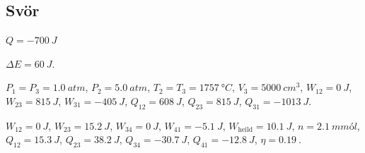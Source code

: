 \ifdefined \wholebook \else\documentclass[oneside]{book}\usepackage{EdlBook}\graphicspath{{figures/}}
\begin{document}
\subsection*{Svör}

\begin{enumerate*}[label = \vspace{0.15cm} \textbf{(\arabic*)}]
\setcounter{enumi}{13}
  \item $Q= \SI{-700}{J}$
  \item $\Delta E = \SI{60}{J}$.
  \item $P_1 = P_3 = \SI{1.0}{atm}$, $P_2 = \SI{5.0}{atm}$, $T_2 = T_3 = \SI{1757}{\degree C}$, $V_3 = \SI{5000}{cm^3}$, $W_{12} = \SI{0}{J}$, $W_{23} = \SI{815}{J}$, $W_{31} = \SI{-405}{J}$, $Q_{12} = \SI{608}{J}$, $Q_{23} = \SI{815}{J}$, $Q_{31} = \SI{-1013}{J}$.
  \item $W_{12} = \SI{0}{J}$, $W_{23} = \SI{15.2}{J}$, $W_{34} = \SI{0}{J}$, $W_{41} = \SI{-5.1}{J}$, $W_{\text{heild}} = \SI{10.1}{J}$, $n = \SI{2.1}{mmól}$, $Q_{12} = \SI{15.3}{J}$, $Q_{23} = \SI{38.2}{J}$, $Q_{34} = \SI{-30.7}{J}$, $Q_{41} = \SI{-12.8}{J}$, $\eta = \SI{0.19}{}$.
\end{enumerate*}



\ifdefined \wholebook \else
 \printindex
\end{document}
